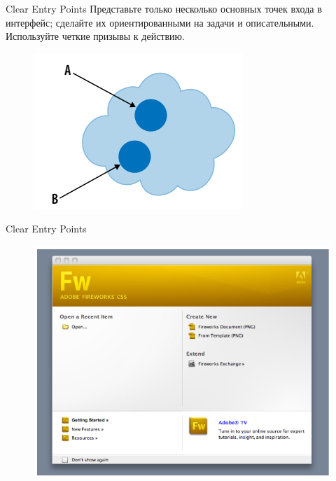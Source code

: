 \documentclass{beamer}
\begin{document}
\begin{frame}[t]{Clear Entry Points}
	Представьте только несколько основных точек входа в интерфейс; сделайте их ориентированными на задачи и описательными. Используйте четкие призывы к действию. 
	\begin{figure}[h]
		\centering
		\includegraphics[scale=0.5]{images/lec07-pic23.png}
	\end{figure}
\end{frame}

\begin{frame}[t]{Clear Entry Points}
	\begin{figure}[h]
		\centering
		\includegraphics[scale=0.5]{images/lec07-pic24.png}
	\end{figure}
\end{frame}
\end{document}
